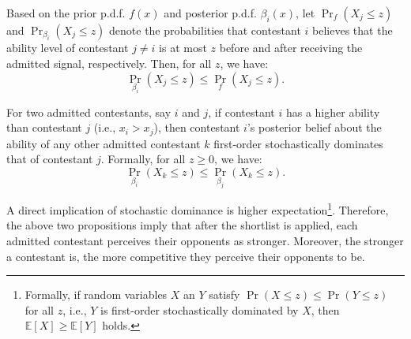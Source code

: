 \begin{proposition}\label{prop:stoDomPos}
    Based on the prior p.d.f. \(f(x)\) and posterior p.d.f. \(\beta_i(x)\), let \(\Pr_{f}(X_j \leq z)\) and \(\Pr_{\beta_i}(X_j \leq z)\) denote the probabilities that contestant \(i\) believes that the ability level of contestant \(j \neq i\) is at most $z$ before and after receiving the admitted signal, respectively. Then, for all $z$, we have:
    \[
    \Pr_{\beta_i}(X_j \leq z) \leq \Pr_{f}(X_j \leq z).
    \]
\end{proposition} 

\begin{proposition}\label{prop:StoDomAbi}
    For two admitted contestants, say $i$ and $j$, if contestant $i$ has a higher ability than contestant $j$ (i.e., $x_i > x_j$), then contestant $i$'s posterior belief about the ability of any other admitted contestant  $k$ first-order stochastically dominates that of contestant $j$. Formally, for all $z\geq 0$, we have:
    \[
    \Pr_{\beta_i}(X_k \leq z) \leq \Pr_{\beta_j}(X_k \leq z).
    \]
\end{proposition}


A direct implication of stochastic dominance is higher expectation\footnote{Formally, if random variables $X$ an $Y$ satisfy $\Pr(X\leq z) \leq \Pr(Y\leq z)$ for all $z$, i.e., $Y$ is first-order stochastically dominated by $X$, then $\mathbb{E}[X] \geq \mathbb{E}[Y]$ holds.}. Therefore, the above two propositions imply that after the shortlist is applied, each admitted contestant perceives their opponents as stronger. Moreover, the stronger a contestant is, the more competitive they perceive their opponents to be.


